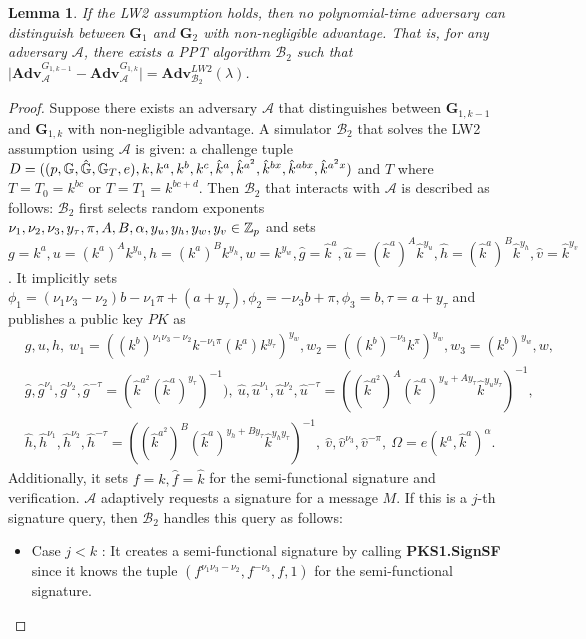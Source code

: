 \documentclass[11pt,letterpaper]{article}
\newtheorem{lemma}[theorem]{Lemma}
\newcommand{\G}{\mathbb{G}}
\newcommand{\Z}{\mathbb{Z}}
\newcommand{\Adv}{\textbf{Adv}}
\newcommand{\mc}[1]{\mathcal{#1}}
\newcommand{\tb}[1]{\textbf{#1}}
\newcommand{\lb}{\linebreak[0]}
\begin{document}
\begin{lemma} \label{lem:pks1-prime-2}
If the LW2 assumption holds, then no polynomial-time adversary can
distinguish between $\tb{G}_1$ and $\tb{G}_2$ with non-negligible advantage.
That is, for any adversary $\mc{A}$, there exists a PPT algorithm $\mc{B}_2$
such that
    $\big| \Adv_{\mc{A}}^{G_{1,k-1}} - \Adv_{\mc{A}}^{G_{1,k}} \big|
    = \Adv_{\mc{B}_2}^{LW2}(\lambda)$.
\end{lemma}

\begin{proof}
Suppose there exists an adversary $\mc{A}$ that distinguishes between
$\tb{G}_{1,k-1}$ and $\tb{G}_{1,k}$ with non-negligible advantage. A
simulator $\mc{B}_2$ that solves the LW2 assumption using $\mc{A}$ is given:
a challenge tuple
    $D = ((p, \G, \hat{\G}, \G_T, e), \lb
    k, k^a, k^b, k^c, \hat{k}^a, \hat{k}^{a^2}, \hat{k}^{bx}, \hat{k}^{abx},
    \hat{k}^{a^2x})$ and $T$
where $T = T_0 = k^{bc}$ or $T = T_1 = k^{bc+d}$. Then $\mc{B}_2$ that
interacts with $\mc{A}$ is described as follows: $\mc{B}_2$ first selects
random exponents $\nu_1, \nu_2, \nu_3, y_{\tau}, \pi, A, B, \alpha, y_u, y_h,
\lb y_w, y_v \in \Z_p$ and sets
    $g = k^a, u = (k^a)^A k^{y_u}, h = (k^a)^B k^{y_h}, w = k^{y_w},
    \hat{g} = \hat{k}^a, \hat{u} = (\hat{k}^a)^A \hat{k}^{y_u},
    \hat{h} = (\hat{k}^a)^B \hat{k}^{y_h}, \hat{v} = \hat{k}^{y_v}$.
It implicitly sets $\phi_1 = (\nu_1 \nu_3 - \nu_2) b - \nu_1 \pi + (a +
y_{\tau}), \phi_2 = -\nu_3 b + \pi, \phi_3 = b, \tau = a + y_{\tau}$ and
publishes a public key $PK$ as
    \begin{align*}
    &   g, u, h,~
        w_1 = ((k^b)^{\nu_1 \nu_3 - \nu_2} k^{-\nu_1 \pi} (k^a) k^{y_{\tau}})^{y_w},
        w_2 = ((k^b)^{-\nu_3} k^{\pi})^{y_w}, w_3 = (k^b)^{y_w}, w,~ \\
    &   \hat{g}, \hat{g}^{\nu_1}, \hat{g}^{\nu_2},
        \hat{g}^{-\tau} = (\hat{k}^{a^2} (\hat{k}^a)^{y_{\tau}})^{-1}),~
        \hat{u}, \hat{u}^{\nu_1}, \hat{u}^{\nu_2},
        \hat{u}^{-\tau} = ((\hat{k}^{a^2})^A (\hat{k}^a)^{y_u + A y_{\tau}}
            \hat{k}^{y_u y_{\tau}})^{-1},~ \\
    &   \hat{h}, \hat{h}^{\nu_1}, \hat{h}^{\nu_2},
        \hat{h}^{-\tau} = ((\hat{k}^{a^2})^B (\hat{k}^a)^{y_h + B y_{\tau}}
            \hat{k}^{y_h y_{\tau}} )^{-1},~
        \hat{v}, \hat{v}^{\nu_3}, \hat{v}^{-\pi},~
        \Omega = e(k^a, \hat{k}^a)^{\alpha}.
    \end{align*}
Additionally, it sets $f = k, \hat{f} = \hat{k}$ for the semi-functional
signature and verification. $\mc{A}$ adaptively requests a signature for a
message $M$. If this is a $j$-th signature query, then $\mc{B}_2$ handles
this query as follows:
\begin{itemize}
\item {Case $j < k$} : It creates a semi-functional signature by calling
    \textbf{PKS1.SignSF} since it knows the tuple $(f^{\nu_1 \nu_3 -
    \nu_2}, f^{-\nu_3}, f, 1)$ for the semi-functional signature.


\end{itemize}
\end{proof}
\end{document}
